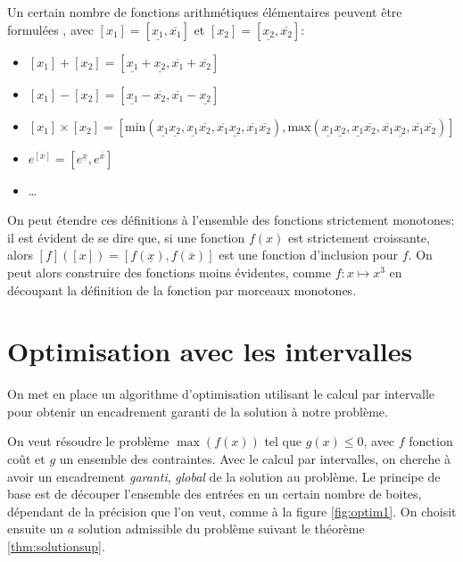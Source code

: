 \begin{ex}
  
  Un certain nombre de fonctions arithmétiques élémentaires peuvent être formulées , avec $[x_1] = [\underline{x_1}, \overline{x_1}]$ et $[x_2] = [\underline{x_2}, \overline{x_2}]$:
  \begin{itemize}
    \item $[x_1] + [x_2] = [\underline{x_1} + \underline{x_2}, \overline{x_1} + \overline{x_2}]$
    \item $[x_1] - [x_2] = [\underline{x_1} - \overline{x_2}, \overline{x_1} - \underline{x_2}]$
    \item $[x_1] \times [x_2] = [\text{min}(\underline{x_1}\underline{x_2}, \underline{x_1}\overline{x_2}, \overline{x_1}\underline{x_2}, \overline{x_1}\overline{x_2}), \text{max}(\underline{x_1}\underline{x_2}, \underline{x_1}\overline{x_2}, \overline{x_1}\underline{x_2}, \overline{x_1}\overline{x_2})]$
    \item $e^{[x]} = [e^{\underline{x}}, e^{\overline{x}}]$
    \item \dots
  \end{itemize}
\end{ex}

On peut étendre ces définitions à l'ensemble des fonctions strictement monotones: il est évident de se dire que, si une fonction $f(x)$ est strictement croissante, alors $[f]([x]) = [f(\underline{x}), f(\overline{x})]$ est une fonction d'inclusion pour $f$. On peut alors construire des fonctions moins évidentes, comme $f : x \mapsto x^3$ en découpant la définition de la fonction par morceaux monotones.

\section{Optimisation avec les intervalles}
On met en place un algorithme d'optimisation utilisant le calcul par intervalle pour obtenir un encadrement garanti de la solution à notre problème.

On veut résoudre le problème $\max(f(x))$ tel que $g(x) \leq 0$, avec $f$ fonction coût et $g$ un ensemble des contraintes. Avec le calcul par intervalles, on cherche à avoir un encadrement \textit{garanti}, \textit{global} de la solution au problème. Le principe de base est de découper l'ensemble des entrées en un certain nombre de boites, dépendant de la précision que l'on veut, comme à la figure \ref{fig:optim1}. On choisit ensuite un $a$ solution admissible du problème suivant le théorème \ref{thm:solutionsup}.

